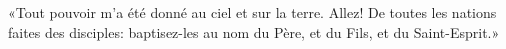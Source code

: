 \encetemps \jesusdisciples
	«Tout pouvoir m’a été donné au ciel et sur la terre.
	Allez! De toutes les nations faites des disciples:
	baptisez-les au nom du Père, et du Fils, et du Saint-Esprit.»
